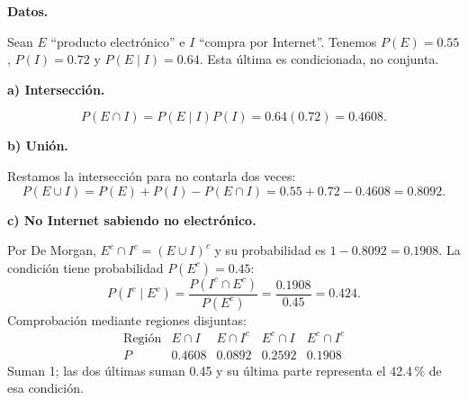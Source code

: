 \textbf{Datos.}\par\nopagebreak[4]
Sean $E$ ``producto electrónico'' e $I$ ``compra por Internet''. Tenemos $P(E)=0.55$, $P(I)=0.72$ y $P(E\mid I)=0.64$. Esta última es condicionada, no conjunta.

\textbf{a) Intersección.}\par\nopagebreak[4]
\[
P(E\cap I)=P(E\mid I)P(I)=0.64(0.72)=\boxed{0.4608}.
\]

\textbf{b) Unión.}\par\nopagebreak[4]
Restamos la intersección para no contarla dos veces:
\[
P(E\cup I)=P(E)+P(I)-P(E\cap I)
=0.55+0.72-0.4608=\boxed{0.8092}.
\]

\textbf{c) No Internet sabiendo no electrónico.}\par\nopagebreak[4]
Por De Morgan, $E^c\cap I^c=(E\cup I)^c$ y su probabilidad es $1-0.8092=0.1908$. La condición tiene probabilidad $P(E^c)=0.45$:
\[
P(I^c\mid E^c)=\frac{P(I^c\cap E^c)}{P(E^c)}
=\frac{0.1908}{0.45}=\boxed{0.424}.
\]
Comprobación mediante regiones disjuntas:
\[\begin{array}{c|cccc}\text{Región}&E\cap I&E\cap I^c&E^c\cap I&E^c\cap I^c\\\hline P&0.4608&0.0892&0.2592&0.1908\end{array}\]
 Suman 1; las dos últimas suman 0.45 y su última parte representa el 42.4\,\% de esa condición.
